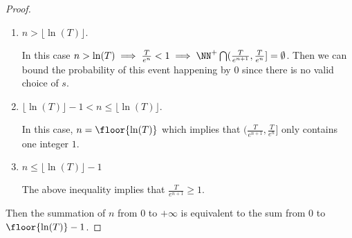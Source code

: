 \begin{proof}
            
            \begin{enumerate}
            \item $n > \lfloor \ln(T) \rfloor$.

            In this case $n > \ln(T) \implies \frac{T}{e^n} < 1 \implies \NN^+ \bigcap (\frac{T}{e^{n+1}}, \frac{T}{e^n}] = \emptyset$.
            Then we can bound the probability of this event happening by 0 since there is no valid choice of $s$.

            \item $\lfloor \ln(T) \rfloor - 1 < n \leq \lfloor \ln(T) \rfloor$.
            
            In this case, $n = \floor{\ln(T)}$ which implies that $( \frac{T}{e^{n+1}}, \frac{T}{e^n}]$ only contains one integer $1$.

            \item $n \leq \lfloor \ln(T) \rfloor - 1$

            The above inequality implies that $\frac{T}{e^{n+1}} \geq 1$.
            \end{enumerate}


            Then the summation of $n$ from $0$ to $+\infty$ is equivalent to the sum from $0$ to $\floor{\ln(T)}-1$.        


\end{proof}
